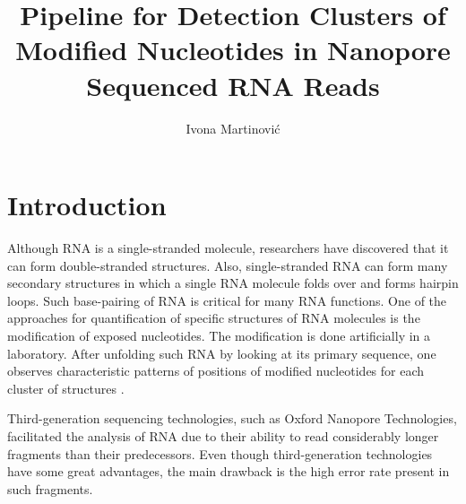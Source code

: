 \documentclass[times, utf8, zavrsni, numeric]{fer}
\begin{document}


\title{Pipeline for Detection Clusters of Modified Nucleotides in Nanopore Sequenced RNA Reads}

\author{Ivona Martinović}

\maketitle

\izvornik

\izvornik


\tableofcontents

\chapter{Introduction}
Although RNA is a single-stranded molecule, researchers have discovered that 
it can form double-stranded structures. Also, single-stranded RNA can form many 
secondary structures in which a single RNA molecule folds over and forms hairpin 
loops. Such base-pairing of RNA is critical for many RNA functions. 
One of the approaches for quantification of specific structures of RNA molecules 
is the modification of exposed nucleotides. The modification is done artificially 
in a laboratory. After unfolding such RNA by looking at its primary sequence, one 
observes characteristic patterns of positions of modified nucleotides for each 
cluster of structures \cite{RNAstructure}.

Third-generation sequencing technologies, such as Oxford Nanopore Technologies, 
facilitated the analysis of RNA due to their ability to read considerably longer 
fragments than their predecessors. Even though third-generation technologies have 
some great advantages, the main drawback is the high error rate present in such 
fragments. 
\end{document}
